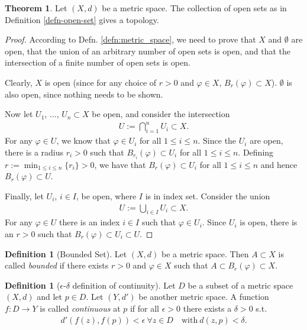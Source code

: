 \documentclass[12pt, a4paper]{article}
\numberwithin{equation}{section}
\theoremstyle{definition}
\theoremstyle{definition}
\newtheorem{defn}[thm]{Definition} %
\newtheorem{theorem}[thm]{Theorem}
\begin{document}
	\begin{theorem}
		Let $(X, d)$ be a metric space. The collection of open sets as in Definition \ref{defn-open-set} gives a topology.
	\end{theorem}
	\begin{proof}		
		According to Defn. \ref{defn:metric_space}, we need to prove that $X$ and $\emptyset$ are open, that the union of an arbitrary number of open sets is open, and that the intersection of a finite number of open sets is open. 
		
		Clearly, $X$ is open (since for any choice of $r > 0$ and $\varphi\in X$, $B_{r}(\varphi)\subset X$). $\emptyset$ is also open, since nothing needs to be shown.
		
		Now let $U_{1}$, $\dots$, $U_{n}\subset X$ be open, and consider the intersection
		\begin{align}
			U := \bigcap_{i=1}^{n}U_{i} \subset X.
		\end{align} 
		For any $\varphi\in U$, we know that $\varphi\in U_i$ for all $1\leq i \leq n$. Since the $U_{i}$ are open, there is a radius $r_{i} > 0$ such that $B_{r_i}(\varphi) \subset U_i$ for all $1\leq i \leq n$. Defining $r := \min_{1 \leq i \leq n}\{r_{i}\} > 0$, we have that $B_{r}(\varphi) \subset U_i$ for all $1\leq i\leq n$ and hence $B_{r}(\varphi)\subset U$.
		
		Finally, let $U_{i}$, $i\in I$, be open, where $I$ is in index set. Consider the union
		\begin{align}
			U := \bigcup_{i\in I}U_{i} \subset X.
		\end{align}
		For any $\varphi\in U$ there is an index $i\in I$ such that $\varphi\in U_i$. Since $U_i$ is open, there is an $r > 0$ such that $B_{r}(\varphi) \subset U_i \subset U$.
	\end{proof}
	
	\begin{defn}[Bounded Set]
		Let $(X, d)$ be a metric space. Then $A\subset X$ is called \textit{bounded} if there exists $r>0$ and $\varphi\in X$ such that $A\subset B_{r}(\varphi)\subset X$. \cite[p. 567]{MfPII}
	\end{defn}
	
	\begin{defn}[$\epsilon$-$\delta$ definition of continuity]
		Let $D$ be a subset of a metric space $(X, d)$ and let $p\in D$. Let $(Y, d')$ be another metric space. A function $f: D\rightarrow Y$ is called \textit{continuous} at $p$ if for all $\epsilon > 0$ there exists a $\delta > 0$ s.t. 
		\begin{align}
			d'\left( f\left(z\right), f\left(p\right) \right) < \epsilon \ \forall z\in D \quad \text{with} \ d\left(z, p\right) < \delta.  
		\end{align}
		 \cite{MfPI}
	\end{defn}
\end{document}
